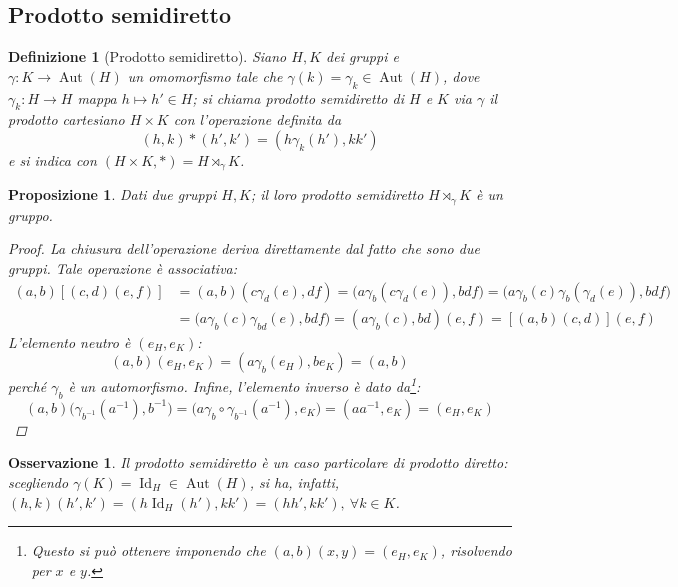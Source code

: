 \documentclass[12pt]{scrartcl}
\theoremstyle{style}
\newtheorem{definizione}{Definizione}[section]
\newtheorem{prop}{Proposizione}[section]
\newtheorem{osservazione}{Osservazione}[section]
\numberwithin{equation}{subsection}
\begin{document}
\subsection{Prodotto semidiretto}
\begin{definizione}
	[Prodotto semidiretto]
	Siano $H ,K$ dei gruppi e $\gamma : K \to \operatorname{Aut} (H)$ un omomorfismo tale che $\gamma(k)=\gamma_k \in \operatorname{Aut} (H)$, dove $\gamma_k : H\to H$ mappa $h\mapsto h' \in H$; si chiama \textit{prodotto semidiretto} di $H$ e $K$ via $\gamma$ il prodotto cartesiano $H\times K$ con l'operazione definita da
	\[
		(h,k) * (h',k') = (h \gamma_k(h'), kk')
	\] 
	e si indica con $(H\times K, *) = H\rtimes _\gamma K$.
\end{definizione}
\begin{prop}
	Dati due gruppi $H,K$; il loro prodotto semidiretto $H \rtimes _\gamma K$ \`e un gruppo.
	\begin{proof}
		La chiusura dell'operazione deriva direttamente dal fatto che sono due gruppi.
		Tale operazione \`e associativa:
		\[
			\begin{split}
				(a,b)\left[ (c,d)(e,f) \right] &=(a,b)(c\gamma_d(e),df) = \big(a \gamma_b(c\gamma_d(e)),bdf\big)= \big(a\gamma_b(c) \gamma_b(\gamma_d(e)),bdf\big)\\
				&=\big(a \gamma_b(c) \gamma_{bd} (e),bdf\big) = (a\gamma_b(c), bd)(e,f) = \left[ (a,b)(c,d) \right] (e,f)
			\end{split}
		\] 
	L'elemento neutro \`e $(e_H,e_K)$:	
\[
	(a,b) (e_H,e_K) = (a \gamma_b(e_H) , be_K) = (a,b)
\] 
perch\'e $\gamma_b$ \`e un automorfismo.
Infine, l'elemento inverso \`e dato da\footnote{Questo si pu\`o ottenere imponendo che $(a,b)(x,y) = (e_H,e_K)$, risolvendo per $x$ e $y$.}:
\[
(a,b) \big(\gamma_{b^{-1}} (a^{-1}), b^{-1}\big) = \big(a \gamma_{b} \circ \gamma_{b^{-1}}(a^{-1}) , e_K \big)=(a a^{-1},e_K) = (e_H,e_K)
\] 
	\end{proof}
\end{prop}
\begin{osservazione}
Il prodotto semidiretto \`e un caso particolare di prodotto diretto: scegliendo $\gamma(K) = \operatorname{Id} _H \in \operatorname{Aut} (H)$, si ha, infatti, $(h,k)(h',k') = (h\operatorname{Id}_H(h'),kk') = (hh',k k'), \ \forall k \in K$.
\end{osservazione}
\end{document}
